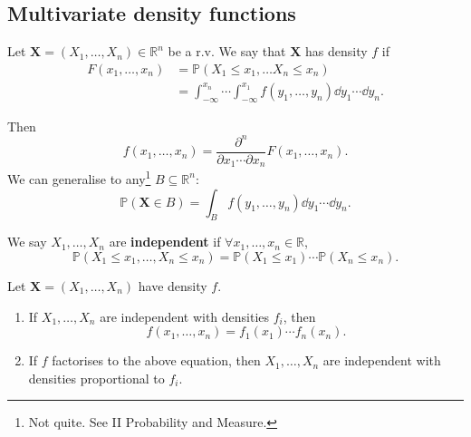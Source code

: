 \subsection{Multivariate density functions}
\begin{definition}
    Let $ \mathbf{X} = (X_1,\dots,X_n)\in \mathbb{R}^{n} $ be a r.v. We say that $\mathbf{X}$ has density $f$ if 
    \begin{align*}
        F(x_1,\dots,x_n) &= \mathbb{P}(X_1\le x_1,\dots X_n\le x_n)\\ &= \int_{-\infty}^{x_n} \cdots \int_{-\infty}^{x_1} f(y_1,\dots,y_n)\dd y_1\cdots\dd y_n.
    \end{align*}
\end{definition}
\begin{note}
    Then 
    \[
        f(x_1,\dots,x_n) = \frac{\partial^n }{\partial x_1 \cdots \partial x_n}F(x_1,\dots,x_n). 
    \]
    We can generalise to any\footnote{Not quite. See II Probability and Measure.} $ B \subseteq \mathbb{R}^{n} $: 
    \[
        \mathbb{P}(\mathbf{X}\in B) = \int_B f(y_1,\dots,y_n)\dd y_1\cdots\dd y_n.
    \]
\end{note}
\begin{definition}[Independence]
    We say $X_1,\dots,X_n$ are \textbf{independent} if $ \forall x_1,\dots,x_n\in \mathbb{R} $, 
    \[
        \mathbb{P}(X_1\le x_1,\dots, X_n\le x_n) = \mathbb{P}(X_1\le x_1)\cdots \mathbb{P}(X_n\le x_n).
    \]
\end{definition}
\begin{theorem}\label{thm:3.9}
    Let $ \mathbf{X} = (X_1,\dots,X_n) $ have density $f$.
    \begin{enumerate}
        \item If $ X_1,\dots,X_n $ are independent with densities $ f_i $, then 
        \[
            f(x_1,\dots,x_n)=f_1(x_1) \cdots f_n(x_n).
        \]
        \item If $f$ factorises to the above equation, then $ X_1,\dots,X_n $ are independent with densities proportional to $ f_i $.
    \end{enumerate}
\end{theorem}
